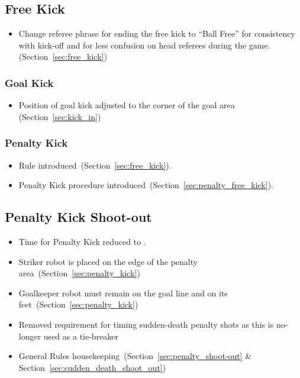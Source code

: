 \subsection*{Free Kick}
\begin{itemize}
  \item Change referee phrase for ending the free kick to ``Ball Free'' for consistency with kick-off and for less confusion on  head referees during the game.(\cf Section~\ref{sec:free_kick})
\end{itemize}

\subsubsection*{Goal Kick}
\begin{itemize}
  \item Position of goal kick adjusted to the corner of the goal area (\cf Section~\ref{sec:kick_in})
\end{itemize}

\subsubsection*{Penalty Kick}
\begin{itemize}
  \item Rule introduced~(\cf Section~\ref{sec:free_kick}).
  \item Penalty Kick procedure introduced~(\cf Section~\ref{sec:penalty_free_kick}).
\end{itemize}

\subsection*{Penalty Kick Shoot-out}
\begin{itemize}
  \item Time for Penalty Kick reduced to \PenaltyKickTime.
  \item Striker robot is placed on the edge of the penalty area~(\cf Section~\ref{sec:penalty_kick})
  \item Goalkeeper robot must remain on the goal line and on its feet~(\cf Section~\ref{sec:penalty_kick})
  \item Removed requirement for timing sudden-death penalty shots as this is no-longer used as a tie-breaker
  \item General Rules housekeeping~(\cf Section~\ref{sec:penalty_shoot-out} \& Section~\ref{sec:sudden_death_shoot_out})
\end{itemize}

